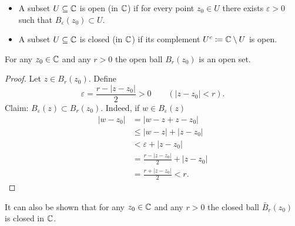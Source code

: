 \documentclass[10pt, a4paper]{article}
\begin{document}
\begin{definition}\phantom{}
    \begin{itemize}
        \item A subset $U \subseteq \mathbb{C}$ is open
        (in $\mathbb{C}$)
        if for every point $z_0 \in U$ there exists $\varepsilon > 0$ such that $B_{\varepsilon}(z_0) \subset U$.

        \item A subset $U \subseteq \mathbb{C}$ is closed
        (in $\mathbb{C}$)
        if its complement $U ^ c \coloneqq \mathbb{C} \setminus U$ is open.
    \end{itemize}
\end{definition}

\begin{lemma}
    For any $z_0 \in \mathbb{C}$ and any $r > 0$ the open ball $B_r(z_0)$ is an open set.

    \begin{proof}
        Let $z \in B_r(z_0)$.
        Define
        \[
        \varepsilon = \frac{r - |z - z_0|}{2} > 0\qquad (|z - z_0| < r).
        \]
        Claim:
        $B_{\varepsilon}(z) \subset B_r(z_0)$.
        Indeed,
        if $w \in B_{\varepsilon}(z)$
        \begin{align*}
            |w - z_0| &= |w - z + z - z_0| \\
            &\leq |w - z| + |z - z_0| \\
            &< \varepsilon + |z - z_0| \\
            &= \frac{r - |z - z_0|}{2} + |z - z_0| \\
            &= \frac{r + |z - z_0|}{2} < r.
        \end{align*}
    \end{proof}
\end{lemma}

\begin{remark}
    It can also be shown that for any $z_0 \in \mathbb{C}$ and any $r > 0$ the closed ball $\bar{B}_r(z_0)$ is closed in $\mathbb{C}$.
\end{remark}
\end{document}
